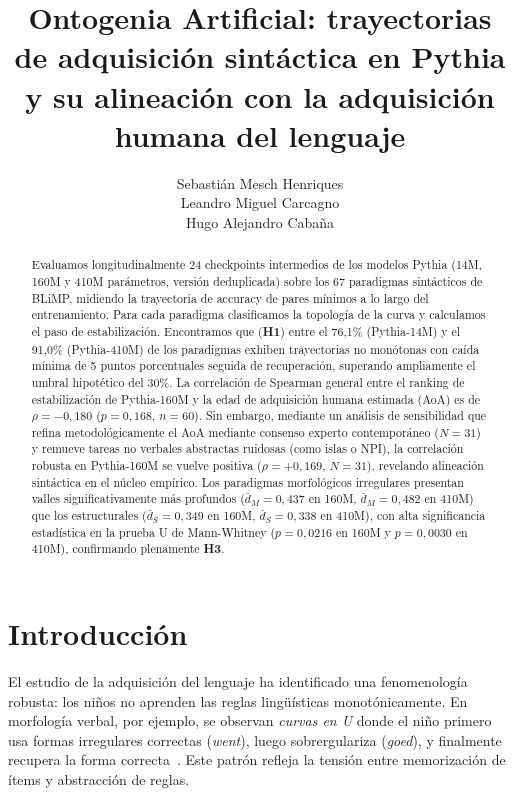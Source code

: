 \documentclass[11pt]{article}
\title{Ontogenia Artificial: trayectorias de adquisición sintáctica en Pythia y su alineación con la adquisición humana del lenguaje}
\author{
  Sebastián Mesch Henriques \\\And
  Leandro Miguel Carcagno \\\And
  Hugo Alejandro Cabaña
}
\begin{document}
\maketitle

\begin{abstract}
Evaluamos longitudinalmente 24 checkpoints intermedios de los modelos Pythia (14M, 160M y 410M parámetros, versión deduplicada) sobre los 67 paradigmas sintácticos de BLiMP, midiendo la trayectoria de accuracy de pares mínimos a lo largo del entrenamiento. Para cada paradigma clasificamos la topología de la curva y calculamos el paso de estabilización. Encontramos que (\textbf{H1}) entre el 76,1\% (Pythia-14M) y el 91,0\% (Pythia-410M) de los paradigmas exhiben trayectorias no monótonas con caída mínima de 5 puntos porcentuales seguida de recuperación, superando ampliamente el umbral hipotético del 30\%. La correlación de Spearman general entre el ranking de estabilización de Pythia-160M y la edad de adquisición humana estimada (AoA) es de $\rho = -0{,}180$ ($p = 0{,}168$, $n = 60$). Sin embargo, mediante un análisis de sensibilidad que refina metodológicamente el AoA mediante consenso experto contemporáneo ($N=31$) y remueve tareas no verbales abstractas ruidosas (como islas o NPI), la correlación robusta en Pythia-160M se vuelve positiva ($\rho = +0{,}169$, $N=31$), revelando alineación sintáctica en el núcleo empírico. Los paradigmas morfológicos irregulares presentan valles significativamente más profundos ($\bar{d}_M = 0{,}437$ en 160M, $\bar{d}_M = 0{,}482$ en 410M) que los estructurales ($\bar{d}_S = 0{,}349$ en 160M, $\bar{d}_S = 0{,}338$ en 410M), con alta significancia estadística en la prueba U de Mann-Whitney ($p = 0{,}0216$ en 160M y $p = 0{,}0030$ en 410M), confirmando plenamente \textbf{H3}.
\end{abstract}

\section{Introducción}
\label{sec:introduccion}

El estudio de la adquisición del lenguaje ha identificado una fenomenología robusta: los niños no aprenden las reglas lingüísticas monotónicamente. En morfología verbal, por ejemplo, se observan \textit{curvas en U} donde el niño primero usa formas irregulares correctas (\textit{went}), luego sobrergulariza (\textit{goed}), y finalmente recupera la forma correcta~\cite{marcus1992overregularization}. Este patrón refleja la tensión entre memorización de ítems y abstracción de reglas.
\end{document}

